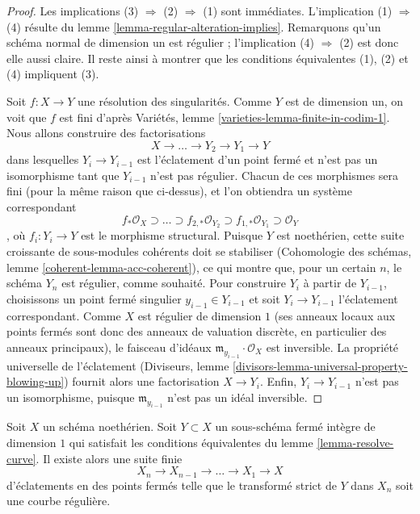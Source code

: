 \begin{proof} Les implications (3) $\Rightarrow$ (2) $\Rightarrow$ (1) sont immédiates. L'implication (1) $\Rightarrow$ (4) résulte du lemme \ref{lemma-regular-alteration-implies}. Remarquons qu'un schéma normal de dimension un est régulier ; l'implication (4) $\Rightarrow$ (2) est donc elle aussi claire. Il reste ainsi à montrer que les conditions équivalentes (1), (2) et (4) impliquent (3).

\medskip\noindent Soit $f : X \to Y$ une résolution des singularités. Comme $Y$ est de dimension un, on voit que $f$ est fini d'après Variétés, lemme \ref{varieties-lemma-finite-in-codim-1}. Nous allons construire des factorisations $$
X \to \ldots \to Y_2 \to Y_1 \to Y
$$ dans lesquelles $Y_i \to Y_{i - 1}$ est l'éclatement d'un point fermé et n'est pas un isomorphisme tant que $Y_{i - 1}$ n'est pas régulier. Chacun de ces morphismes sera fini (pour la même raison que ci-dessus), et l'on obtiendra un système correspondant $$
f_*\mathcal{O}_X \supset \ldots \supset
f_{2, *}\mathcal{O}_{Y_2} \supset
f_{1, *}\mathcal{O}_{Y_1} \supset \mathcal{O}_Y
$$, où $f_i : Y_i \to Y$ est le morphisme structural. Puisque $Y$ est noethérien, cette suite croissante de sous-modules cohérents doit se stabiliser (Cohomologie des schémas, lemme \ref{coherent-lemma-acc-coherent}), ce qui montre que, pour un certain $n$, le schéma $Y_n$ est régulier, comme souhaité. Pour construire $Y_i$ à partir de $Y_{i - 1}$, choisissons un point fermé singulier $y_{i - 1} \in Y_{i - 1}$ et soit $Y_i \to Y_{i - 1}$ l'éclatement correspondant. Comme $X$ est régulier de dimension $1$ (ses anneaux locaux aux points fermés sont donc des anneaux de valuation discrète, en particulier des anneaux principaux), le faisceau d'idéaux $\mathfrak m_{y_{i - 1}} \cdot \mathcal{O}_X$ est inversible. La propriété universelle de l'éclatement (Diviseurs, lemme \ref{divisors-lemma-universal-property-blowing-up}) fournit alors une factorisation $X \to Y_i$. Enfin, $Y_i \to Y_{i - 1}$ n'est pas un isomorphisme, puisque $\mathfrak m_{y_{i - 1}}$ n'est pas un idéal inversible. \end{proof}

\begin{lemma} \label{lemma-blowup-curve} Soit $X$ un schéma noethérien. Soit $Y \subset X$ un sous-schéma fermé intègre de dimension $1$ qui satisfait les conditions équivalentes du lemme \ref{lemma-resolve-curve}. Il existe alors une suite finie $$
X_n \to X_{n - 1} \to \ldots \to X_1 \to X
$$ d'éclatements en des points fermés telle que le transformé strict de $Y$ dans $X_n$ soit une courbe régulière. \end{lemma}

